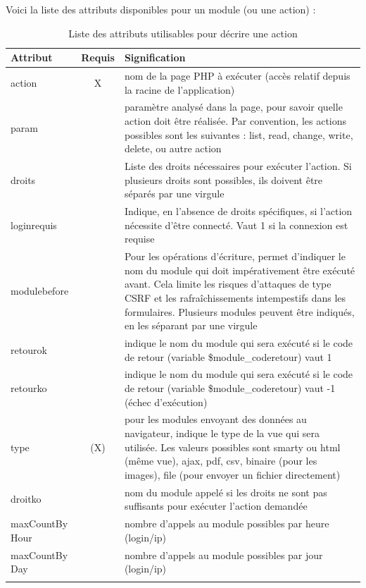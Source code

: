 Voici la liste des attributs disponibles pour un module (ou une action) :
\begin{longtable}{|p{2.5cm}|c|p{9cm}|}
\hline
\textbf{Attribut} & \textbf{Requis} & \textbf{Signification} \\
\hline
\endhead
\hline\endfoot\endlastfoot
action & X & nom de la page PHP à exécuter (accès relatif depuis la racine de l'application) \\
param &  & paramètre analysé dans la page, pour savoir quelle action doit être réalisée. Par convention, les actions possibles sont les suivantes : list, read, change, write, delete, ou autre action \\
droits &  & Liste des droits nécessaires pour exécuter l'action. Si plusieurs droits sont possibles, ils doivent être séparés par une virgule\\
loginrequis & & Indique, en l'absence de droits spécifiques, si l'action nécessite d'être connecté. Vaut 1 si la connexion est requise\\
modulebefore & & Pour les opérations d'écriture, permet d'indiquer le nom du module qui doit impérativement être exécuté avant. Cela limite les risques d'attaques de type CSRF et les rafraîchissements intempestifs dans les formulaires. Plusieurs modules peuvent être indiqués, en les séparant par une virgule\\
retourok & & indique le nom du module qui sera exécuté si le code de retour (variable \$module\_coderetour) vaut 1 \\
retourko & & indique le nom du module qui sera exécuté si le code de retour (variable \$module\_coderetour) vaut -1 (échec d'exécution) \\
type & (X) & pour les modules envoyant des données au navigateur, indique le type de la vue qui sera utilisée. Les valeurs possibles sont smarty ou html (même vue), ajax, pdf, csv, binaire (pour les images), file (pour envoyer un fichier directement)  \\
droitko & & nom du module appelé si les droits ne sont pas suffisants pour exécuter l'action demandée \\
maxCountBy Hour & & nombre d'appels au module possibles par heure (login/ip) \\
maxCountBy Day & & nombre d'appels au module possibles par jour (login/ip) \\
\hline 
 
 \caption{Liste des attributs utilisables pour décrire une action}\label{actions}
\end{longtable}

